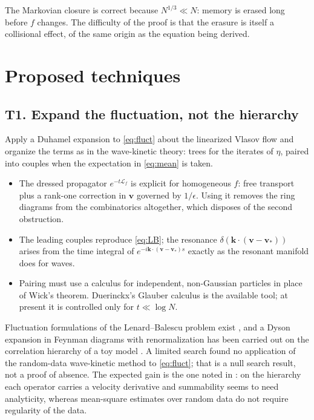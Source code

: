\documentclass[11pt]{article}
\newcommand{\bv}{\mathbf{v}}
\newcommand{\bk}{\mathbf{k}}
\newcommand{\diel}{\epsilon}
\theoremstyle{definition}
\begin{document}
The Markovian closure is correct because $N^{1/3}\ll N$: memory is erased
long before $f$ changes. The difficulty of the proof is that the erasure is
itself a collisional effect, of the same origin as the equation being
derived.

\section{Proposed techniques}
\label{sec:techniques}

\subsection{T1. Expand the fluctuation, not the hierarchy}

Apply a Duhamel expansion to \eqref{eq:fluct} about the linearized Vlasov
flow and organize the terms as in the wave-kinetic theory: trees for the
iterates of $\eta$, paired into couples when the expectation in
\eqref{eq:mean} is taken.
\begin{itemize}
  \item The dressed propagator $e^{-t\mathcal{L}_f}$ is explicit for
    homogeneous $f$: free transport plus a rank-one correction in $\bv$
    governed by $1/\diel$. Using it removes the ring diagrams from the
    combinatorics altogether, which disposes of the second obstruction.
  \item The leading couples reproduce \eqref{eq:LB}; the resonance
    $\delta(\bk\cdot(\bv-\bv_*))$ arises from the time integral of
    $e^{-i\bk\cdot(\bv-\bv_*)s}$ exactly as the resonant manifold does for
    waves.
  \item Pairing must use a calculus for independent, non-Gaussian particles
    in place of Wick's theorem. Duerinckx's Glauber calculus
    \cite{DuerinckxChaos} is the available tool; at present it is controlled
    only for $t\ll\log N$.
\end{itemize}
Fluctuation formulations of the Lenard--Balescu problem exist
\cite{Lancellotti,FeliachiBouchet}, and a Dyson expansion in Feynman diagrams
with renormalization has been carried out on the correlation hierarchy of a
toy model \cite{DuerinckxLeBihan}. A limited search found no application of
the random-data wave-kinetic method to \eqref{eq:fluct}; that is a null
search result, not a proof of absence. The expected gain is the one noted in
\cite{DuerinckxSR}: on the hierarchy each operator carries a velocity
derivative and summability seems to need analyticity, whereas mean-square
estimates over random data do not require regularity of the data.
\end{document}
